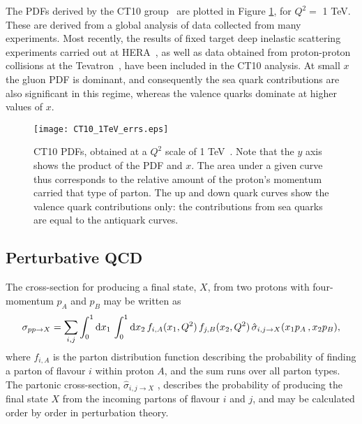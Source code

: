 The PDFs derived by the CT10 group~\cite{CT10_note} are plotted in Figure \ref{CT10_fig}, for $Q^2 = $ 1 TeV. These are derived from a global analysis of data collected from many experiments. Most recently, the results of fixed target deep inelastic scattering experiments carried out at HERA~\cite{Hera}, as well as data obtained from proton-proton collisions at the Tevatron~\cite{Tevatron}, have been included in the CT10 analysis. At small $x$ the gluon PDF is dominant, and consequently the sea quark contributions are also significant in this regime, whereas the valence quarks dominate at higher values of $x$.
\begin{figure}[h]
\begin{center}
\texttt{[image: CT10\_1TeV\_errs.eps]}
\end{center}
\caption[CT10 parton distribution functions]{CT10 PDFs, obtained at a $Q^2$ scale of 1 TeV~\cite{CT10_note,hepdata}. Note that the $y$ axis shows the product of the PDF and $x$. The area under a given curve thus corresponds to the relative amount of the proton's momentum carried that type of parton. The up and down quark curves show the valence quark contributions only: the contributions from sea quarks are equal to the antiquark curves.}
\label{CT10_fig}
\end{figure}


\subsection{Perturbative QCD}


The cross-section for producing a final state, $X$, from two protons with four-momentum $p_A$ and $p_B$ may be written as~\cite{hard_quarks}
\begin{equation}
\sigma_{pp \rightarrow X} =   \sum_{i,j}\int_0^1 \mathrm{d} x_1 \,\int_0^1 \mathrm{d} x_2 \, f_{i,A}(x_1,Q^2)\, f_{j,B} (x_2,Q^2)\, \hat{\sigma}_{i,j \rightarrow X}(x_1 p_A\, , x_2 p_B),
\end{equation}
where $f_{i,A}$ is the parton distribution function describing the probability of finding a parton of flavour $i$ within proton $A$, and the sum runs over all parton types. The partonic cross-section, $\hat{\sigma}_{i,j \rightarrow X}$ , describes the probability of producing the final state $X$ from the incoming partons of flavour $i$ and $j$, and may be calculated order by order in perturbation theory.

